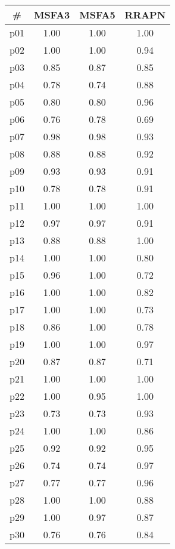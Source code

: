 \begin{tabular}{c||c|c|c}
\textbf{\#} & \textbf{MSFA3} & \textbf{MSFA5} & \textbf{RRAPN}\\
\hline
\hline
p01 & 1.00 & 1.00 & 1.00\\
p02 & 1.00 & 1.00 & 0.94\\
p03 & 0.85 & 0.87 & 0.85\\
p04 & 0.78 & 0.74 & 0.88\\
p05 & 0.80 & 0.80 & 0.96\\
p06 & 0.76 & 0.78 & 0.69\\
p07 & 0.98 & 0.98 & 0.93\\
p08 & 0.88 & 0.88 & 0.92\\
p09 & 0.93 & 0.93 & 0.91\\
p10 & 0.78 & 0.78 & 0.91\\
p11 & 1.00 & 1.00 & 1.00\\
p12 & 0.97 & 0.97 & 0.91\\
p13 & 0.88 & 0.88 & 1.00\\
p14 & 1.00 & 1.00 & 0.80\\
p15 & 0.96 & 1.00 & 0.72\\
p16 & 1.00 & 1.00 & 0.82\\
p17 & 1.00 & 1.00 & 0.73\\
p18 & 0.86 & 1.00 & 0.78\\
p19 & 1.00 & 1.00 & 0.97\\
p20 & 0.87 & 0.87 & 0.71\\
p21 & 1.00 & 1.00 & 1.00\\
p22 & 1.00 & 0.95 & 1.00\\
p23 & 0.73 & 0.73 & 0.93\\
p24 & 1.00 & 1.00 & 0.86\\
p25 & 0.92 & 0.92 & 0.95\\
p26 & 0.74 & 0.74 & 0.97\\
p27 & 0.77 & 0.77 & 0.96\\
p28 & 1.00 & 1.00 & 0.88\\
p29 & 1.00 & 0.97 & 0.87\\
p30 & 0.76 & 0.76 & 0.84\\
\end{tabular}

